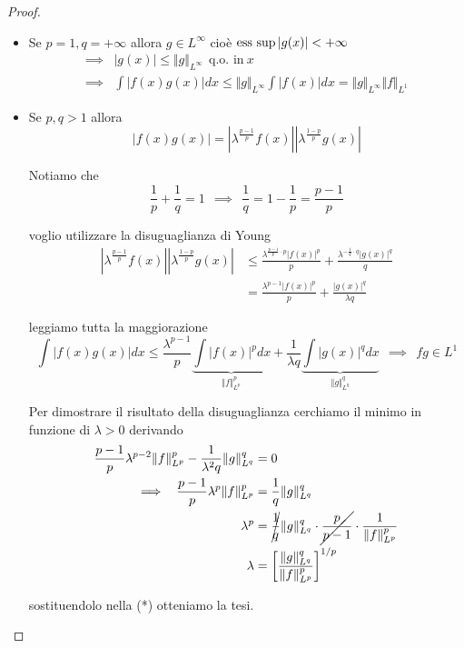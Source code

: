 \begin{proof}\leavevmode
\begin{itemize}
\item Se $p = 1, q = + \infty $ allora $g\in L^{\infty}$ cioè $\operatorname*{ess\ sup}| g(x)| < + \infty $
\begin{align*}
\implies & | g(x)| \leq \Vert g \Vert_{L^{\infty}} \ \ \text{q.o. in} \ x\\
\implies & \int | f(x) g(x)| dx\leq \Vert g \Vert_{L^{\infty}}\int | f(x)| dx = \Vert g \Vert_{L^{\infty}} \Vert f \Vert_{L^{1}}
\end{align*}
\item Se $p, q > 1$ allora
\begin{equation*}
| f(x) g(x)| = \left| \lambda^{\frac{p - 1}{p}} f(x)\right| \left| \lambda^{\frac{1 - p}{p}} g(x)\right|
\end{equation*}

Notiamo che
\begin{equation*}
\frac{1}{p} + \frac{1}{q} = 1\ \ \implies \ \ \frac{1}{q} = 1 - \frac{1}{p} = \frac{p - 1}{p}
\end{equation*}

voglio utilizzare la disuguaglianza di Young
\begin{align*}
\left| \lambda^{\frac{p - 1}{p}} f(x)\right| \left| \lambda^{\frac{1 - p}{p}} g(x)\right| & \leq \frac{\lambda^{\frac{p - 1}{p} \cdot p}| f(x)|^{p}}{p} + \frac{\lambda^{- \frac{1}{q} \cdot q}| g(x)|^{q}}{q}\\
 & = \frac{\lambda^{p - 1}| f(x)|^{p}}{p} + \frac{| g(x)|^{q}}{\lambda q}
\end{align*}

leggiamo tutta la maggiorazione
\begin{equation}
\int | f(x) g(x)| dx\leq \frac{\lambda^{p - 1}}{p}\underbrace{\int | f(x)|^{p} dx}_{\Vert f \Vert^{p}_{L^{p}}} + \frac{1}{\lambda q}\underbrace{\int | g(x)|^{q} dx}_{\Vert g \Vert^{q}_{L^{q}}} \ \ \implies \ \ fg\in L^{1} \tag{*}
\end{equation}

Per dimostrare il risultato della disuguaglianza cerchiamo il minimo in funzione di $\lambda > 0$ derivando
\begin{align*}
\frac{p - 1}{p} \lambda^{p - 2} \Vert f \Vert^{p}_{L^{p}} - \frac{1}{\lambda^{2} q} \Vert g \Vert^{q}_{L^{q}} & = 0\\
\implies \ \ \frac{p - 1}{p} \lambda^{p} \Vert f \Vert^{p}_{L^{p}} & = \frac{1}{q} \Vert g \Vert^{q}_{L^{q}}\\
\lambda^{p} & = \cancel{\frac{1}{q}} \Vert g \Vert^{q}_{L^{q}} \cdot \cancel{\frac{p}{p - 1}} \cdot \frac{1}{\Vert f \Vert^{p}_{L^{p}}}\\
\lambda & = \left[\frac{\Vert g \Vert^{q}_{L^{q}}}{\Vert f \Vert^{p}_{L^{p}}}\right]^{1/p}
\end{align*}

sostituendolo nella (*) otteniamo la tesi.

\end{itemize}
\end{proof}
